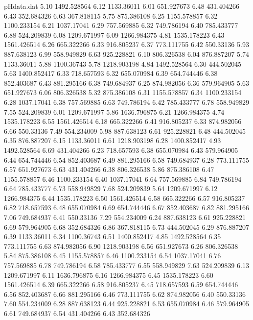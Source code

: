 \begin{filecontents}{pHdata.dat}
5.10 	1492.528564
6.12 	1133.36011
6.01 	651.927673
6.48 	431.404266
6.43 	352.684326
6.63 	367.818115
5.75 	875.386108
6.25 	1155.578857
6.32 	1100.233154
6.21 	1037.17041
6.29 	757.569885
6.32 	749.786194
6.40 	785.433777
6.88 	524.209839
6.08 	1209.671997
6.09 	1266.984375
4.81 	1535.178223
6.43 	1561.426514
6.26 	665.322266
6.33 	916.805237
6.37 	773.111755
6.42 	550.33136
5.93 	887.638123
6.99 	558.949829
6.63 	925.228821
6.10 	806.326538
6.04 	876.887207
5.74 	1133.36011
5.88 	1100.36743
5.78 	1218.903198
4.84 	1492.528564
6.30 	444.502045
5.63 	1400.852417
6.33 	718.657593
6.32 	655.070984
6.39 	654.744446
6.38 	852.403687
6.43 	881.295166
6.38 	749.684937
6.25 	874.982056
6.36 	579.964905
5.63 	651.927673
6.06 	806.326538
5.32 	875.386108
6.31 	1155.578857
6.34 	1100.233154
6.28 	1037.17041
6.38 	757.569885
6.63 	749.786194
6.42 	785.433777
6.78 	558.949829
7.55 	524.209839
6.01 	1209.671997
5.86 	1636.796875
6.21 	1266.984375
4.74 	1535.178223
6.55 	1561.426514
6.18 	665.322266
6.41 	916.805237
6.33 	874.982056
6.66 	550.33136
7.49 	554.234009
5.98 	887.638123
6.61 	925.228821
6.48 	444.502045
6.35 	876.887207
6.15 	1133.36011
6.61 	1218.903198
6.28 	1400.852417
4.93 	1492.528564
6.69 	431.404266
6.23 	718.657593
6.38 	655.070984
6.43 	579.964905
6.44 	654.744446
6.54 	852.403687
6.49 	881.295166
6.58 	749.684937
6.28 	773.111755
6.57 	651.927673
6.63 	431.404266
6.38 	806.326538
5.86 	875.386108
6.47 	1155.578857
6.46 	1100.233154
6.40 	1037.17041
6.64 	757.569885
6.84 	749.786194
6.64 	785.433777
6.73 	558.949829
7.68 	524.209839
5.64 	1209.671997
6.12 	1266.984375
6.44 	1535.178223
6.50 	1561.426514
6.58 	665.322266
6.57 	916.805237
6.82 	718.657593
6.48 	655.070984
6.69 	654.744446
6.67 	852.403687
6.82 	881.295166
7.06 	749.684937
6.41 	550.33136
7.29 	554.234009
6.24 	887.638123
6.61 	925.228821
6.69 	579.964905
6.68 	352.684326
6.86 	367.818115
6.73 	444.502045
6.29 	876.887207
6.39 	1133.36011
6.34 	1100.36743
6.51 	1400.852417
4.85 	1492.528564
6.35 	773.111755
6.63 	874.982056
6.90 	1218.903198
6.56 	651.927673
6.26 	806.326538
5.84 	875.386108
6.45 	1155.578857
6.46 	1100.233154
6.54 	1037.17041
6.76 	757.569885
6.78 	749.786194
6.58 	785.433777
6.55 	558.949829
7.63 	524.209839
6.13 	1209.671997
6.11 	1636.796875
6.16 	1266.984375
6.45 	1535.178223
6.60 	1561.426514
6.39 	665.322266
6.58 	916.805237
6.45 	718.657593
6.59 	654.744446
6.56 	852.403687
6.66 	881.295166
6.46 	773.111755
6.62 	874.982056
6.40 	550.33136
7.60 	554.234009
6.28 	887.638123
6.44 	925.228821
6.53 	655.070984
6.46 	579.964905
6.61 	749.684937
6.54 	431.404266
6.43 	352.684326

\end{filecontents}
